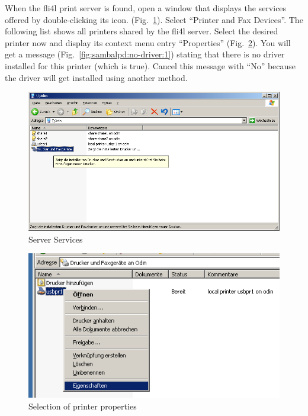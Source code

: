 When the fli4l print server is found, open a window that displays the services
offered by double-clicking its icon.
(Fig.~\ref{fig:sambalpd:services}). Select ``Printer and Fax Devices''. The
following list shows all printers shared by the fli4l server. Select the desired
printer now and display its context menu entry ``Properties''
(Fig.~\ref{fig:sambalpd:printerproperties}). You will get a message
(Fig.~\ref{fig:sambalpd:no-driver:1}) stating that there is no driver installed
for this printer (which is true). Cancel this message with ``No'' because the
driver will get installed using another method.

\begin{figure}[hbt!]
\centering
\includegraphics[width=\columnwidth]{image006}
\caption{Server Services}
\label{fig:sambalpd:services}
\end{figure}

\begin{figure}[hbt!]
\centering
\includegraphics[width=\columnwidth]{image007}
\caption{Selection of printer properties}
\label{fig:sambalpd:printerproperties}
\end{figure}

